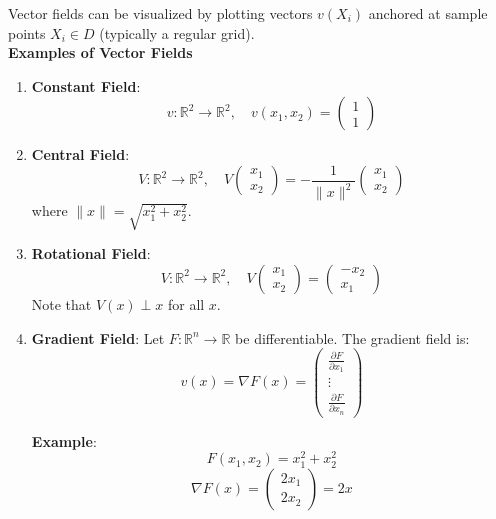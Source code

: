 \documentclass{article}
\begin{document}
Vector fields can be visualized by plotting vectors \( v(X_i) \) anchored at sample points \( X_i \in D \) (typically a regular grid).
\\
\textbf{Examples of Vector Fields}
\begin{enumerate}
    \item \textbf{Constant Field}:
    \[ v : \mathbb{R}^2 \to \mathbb{R}^2, \quad v(x_1, x_2) = \begin{pmatrix} 1 \\ 1 \end{pmatrix} \]
    
    
    \item \textbf{Central Field}:
    \[ V : \mathbb{R}^2 \to \mathbb{R}^2, \quad V\begin{pmatrix} x_1 \\ x_2 \end{pmatrix} = -\frac{1}{\|x\|^2} \begin{pmatrix} x_1 \\ x_2 \end{pmatrix} \]
    where \( \|x\| = \sqrt{x_1^2 + x_2^2} \).
    
    \item \textbf{Rotational Field}:
    \[ V : \mathbb{R}^2 \to \mathbb{R}^2, \quad V\begin{pmatrix} x_1 \\ x_2 \end{pmatrix} = \begin{pmatrix} -x_2 \\ x_1 \end{pmatrix} \]
    Note that \( V(x) \perp x \) for all \( x \).
    
    \item \textbf{Gradient Field}:
    Let \( F: \mathbb{R}^n \to \mathbb{R} \) be differentiable. The gradient field is:
    \[ v(x) = \nabla F(x) = \begin{pmatrix} \frac{\partial F}{\partial x_1} \\ \vdots \\ \frac{\partial F}{\partial x_n} \end{pmatrix} \]
    
    \textbf{Example}:
    \[ F(x_1,x_2) = x_1^2 + x_2^2 \]
    \[ \nabla F(x) = \begin{pmatrix} 2x_1 \\ 2x_2 \end{pmatrix} = 2x \]
\end{enumerate}
\end{document}
